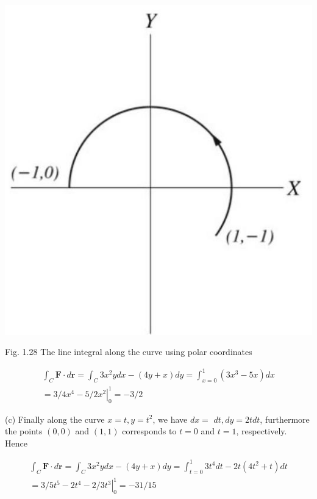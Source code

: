 \documentclass[10pt]{article}
\begin{document}
\begin{center}
\includegraphics[max width=\textwidth]{2024_09_13_db1f357d2aad0a03eb2eg-025(1)}
\end{center}

Fig. 1.28 The line integral along the curve using polar coordinates

$$
\begin{gathered}
\int_{C} \mathbf{F} \cdot d \mathbf{r}=\int_{C} 3 x^{2} y d x-(4 y+x) d y=\int_{x=0}^{1}\left(3 x^{3}-5 x\right) d x \\
=3 / 4 x^{4}-5 /\left.2 x^{2}\right|_{0} ^{1}=-3 / 2
\end{gathered}
$$

(c) Finally along the curve $x=t, y=t^{2}$, we have $d x=$ $d t, d y=2 t d t$, furthermore the points $(0,0)$ and $(1,1)$ corresponds to $t=0$ and $t=1$, respectively. Hence

$$
\begin{gathered}
\int_{C} \mathbf{F} \cdot d \mathbf{r}=\int_{C} 3 x^{2} y d x-(4 y+x) d y=\int_{t=0}^{1} 3 t^{4} d t-2 t\left(4 t^{2}+t\right) d t \\
=3 / 5 t^{5}-2 t^{4}-2 /\left.3 t^{3}\right|_{0} ^{1}=-31 / 15
\end{gathered}
$$
\end{document}
